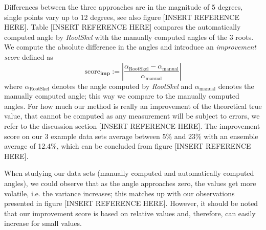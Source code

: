 Differences between the three approaches are in the magnitude of 5 degrees, single points vary up to 12 degrees, see also figure [INSERT REFERENCE HERE].
Table [INSERT REFERENCE HERE] compares the automatically computed angle by \textit{RootSkel} with the manually computed angles of the 3 roots. We compute the absolute difference in the angles and introduce an \textit{improvement score} defined as 
\[
 \text{score}_{\textbf{imp}} := | \frac{ \alpha_{\text{RootSkel}} - \alpha_{\text{manual}} }{\alpha_{\text{manual}}} |
\]
where $\alpha_{\text{RootSkel}}$ denotes the angle computed by \textit{RootSkel} and $\alpha_{\text{manual}}$ denotes the manually computed angle; this way we compare to the manually computed angles. For how much our method is really an improvement of the theoretical true value, that cannot be computed as any measurement will be subject to errors, we refer to the discussion section [INSERT REFERENCE HERE]. The improvement score on our 3 example data sets average between 5\% and 23\% with an ensemble average of 12.4\%, which can be concluded from figure [INSERT REFERENCE HERE].

When studying our data sets (manually computed and automatically computed angles), we could observe that as the angle approaches zero, the values get more volatile, i.e. the variance increases; this matches up with our observations presented in figure [INSERT REFERENCE HERE]. However, it should be noted that our improvement score is based on relative values and, therefore, can easily increase for small values. %


